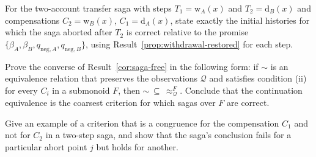 \begin{exercise}
For the two-account transfer saga with steps $T_1=\mathrm{w}_A(x)$ and $T_2=\mathrm{d}_B(x)$ and compensations $C_2=\mathrm{w}_B(x)$, $C_1=\mathrm{d}_A(x)$, state exactly the initial histories for which the saga aborted after $T_2$ is correct relative to the promise $\{\beta_A,\beta_B,q_{\mathrm{neg},A},q_{\mathrm{neg},B}\}$, using Result~\ref{prop:withdrawal-restored} for each step.
\end{exercise}

\begin{exercise}
Prove the converse of Result~\ref{cor:saga-free} in the following form: if $\sim$ is an equivalence relation that preserves the observations $\mathcal Q$ and satisfies condition (ii) for every $C_i$ in a submonoid $F$, then $\sim\,\subseteq\,\approx^{F}_{\mathcal Q}$. Conclude that the continuation equivalence is the coarsest criterion for which sagas over $F$ are correct.
\end{exercise}

\begin{exercise}
Give an example of a criterion that is a congruence for the compensation $C_1$ and not for $C_2$ in a two-step saga, and show that the saga's conclusion fails for a particular abort point $j$ but holds for another.
\end{exercise}

